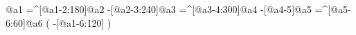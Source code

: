                    @{a1}%
    =^[@{a1-2}:180]@{a2}%
     -[@{a2-3}:240]@{a3}%
    =^[@{a3-4}:300]@{a4}%
         -[@{a4-5}]@{a5}%
     =^[@{a5-6}:60]@{a6}%
                      (
         -[@{a1-6}:120]%
                      )
